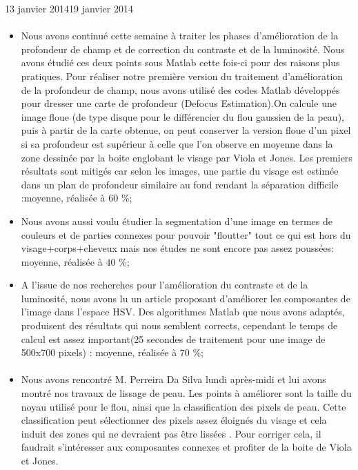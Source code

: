 \documentclass[11pt, french]{report-rd-info}
\begin{document}
\begin{fichesuivi}{13 janvier 2014}{19 janvier 2014}
\paragraph{}
	\begin{travaileffectue}
		\begin{itemize}
			\item Nous avons continué cette semaine à traiter les phases d'amélioration de la profondeur de champ et de correction du contraste et de la luminosité. Nous avons étudié ces deux points sous Matlab cette fois-ci pour des raisons plus pratiques. Pour réaliser notre première version du traitement d'amélioration de la profondeur de champ, nous avons utilisé des codes Matlab développés pour dresser une carte de profondeur (Defocus Estimation).On calcule une image floue (de type disque pour le différencier du flou gaussien de la peau), puis à partir de la carte obtenue, on peut conserver la version floue d'un pixel si sa profondeur est supérieur à celle que l'on observe en moyenne dans la zone dessinée par la boite englobant le visage par Viola et Jones. Les premiers résultats sont mitigés car selon les images, une partie du visage est estimée dans un plan de profondeur similaire au fond rendant la séparation difficile :moyenne, réalisée à $60$ \%;
			\item Nous avons aussi voulu étudier la segmentation d'une image en termes de couleurs et de parties connexes pour pouvoir "floutter" tout ce qui est hors du visage+corps+cheveux mais nos études ne sont encore pas assez poussées: moyenne, réalisée à $40$ \%;
			\item A l'issue de nos recherches pour l'amélioration du contraste et de la luminosité, nous avons lu un article proposant d'améliorer les composantes de l'image dans l'espace HSV. Des algorithmes Matlab que nous avons adaptés, produisent des résultats qui nous semblent corrects, cependant le temps de calcul est assez important(25 secondes de traitement pour une image de 500x700 pixels) : moyenne, réalisée à $70$ \%;
		\end{itemize}
	\end{travaileffectue}

\paragraph{}
	\begin{echange}
		\begin{itemize}
			\item Nous avons rencontré M. Perreira Da Silva lundi après-midi et lui avons montré nos travaux de lissage de peau. Les points à améliorer sont la taille du noyau utilisé pour le flou, ainsi que la classification des pixels de peau. Cette classification peut sélectionner des pixels assez éloignés du visage et cela induit des zones qui ne devraient pas être lissées . Pour corriger cela, il faudrait s'intéresser aux composantes connexes et profiter de la boite de Viola et Jones.
		\end{itemize}
	\end{echange}



\end{fichesuivi}
\end{document}
